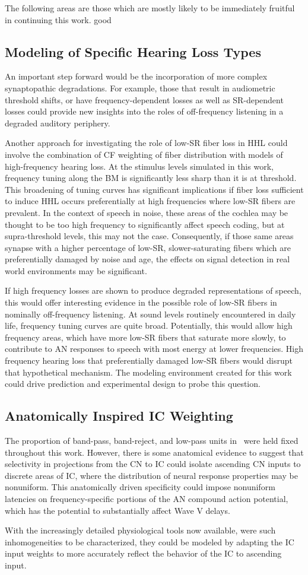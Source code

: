 The following areas are those which are mostly likely to be immediately fruitful in continuing this work.  good 
\label{sec:future_directions}
\subsection{Modeling of Specific Hearing Loss Types} %
\label{sub:modeling_of_specific_hearing_loss_types}
An important step forward would be the incorporation of more complex synaptopathic degradations.  For example, those that result in audiometric threshold shifts, or have frequency-dependent losses as well as SR-dependent losses could provide new insights into the roles of off-frequency listening in a degraded auditory periphery.

Another approach for investigating the role of low-SR fiber loss in HHL could involve the combination of CF weighting of fiber distribution with models of high-frequency hearing loss.  At the stimulus levels simulated in this work, frequency tuning along the BM is significantly less sharp than it is at threshold.  This broadening of tuning curves has significant implications if fiber loss sufficient to induce HHL occurs preferentially at high frequencies where low-SR fibers are prevalent.   In the context of speech in noise, these areas of the cochlea may be thought to be too high frequency to significantly affect speech coding, but at supra-threshold levels, this may not the case. Consequently, if those same areas synapse with a higher percentage of low-SR, slower-saturating fibers which are preferentially damaged by noise and age, the effects on signal detection in real world environments may be significant. 

If high frequency losses are shown to produce degraded representations of speech, this would offer interesting evidence in the possible role of low-SR fibers in nominally off-frequency listening.  At sound levels routinely encountered in daily life, frequency tuning curves are quite broad.  Potentially, this would allow high frequency areas, which have more low-SR fibers that saturate more slowly, to contribute to AN responses to speech with most energy at lower frequencies.  High frequency hearing loss that preferentially damaged low-SR fibers would disrupt that hypothetical mechanism.  The modeling environment created for this work could drive prediction and experimental design to probe this question. 

\subsection{Anatomically Inspired IC Weighting} %
\label{sub:anatomically_inspired_brainstem_adaptation}
The proportion of band-pass, band-reject, and low-pass units in~\cite{Carney2015Speech} were held fixed throughout this work.  However, there is some anatomical evidence to suggest that selectivity in projections from the CN to IC could isolate ascending CN inputs to discrete areas of IC, where the distribution of neural response properties may be nonuniform.  This anatomically driven specificity could impose nonuniform latencies on frequency-specific portions of the AN compound action potential, which has the potential to substantially affect Wave V delays.

With the increasingly detailed physiological tools now available, were such inhomogeneities to be characterized, they could be modeled by adapting the IC input weights to more accurately reflect the behavior of the IC to ascending input. 
